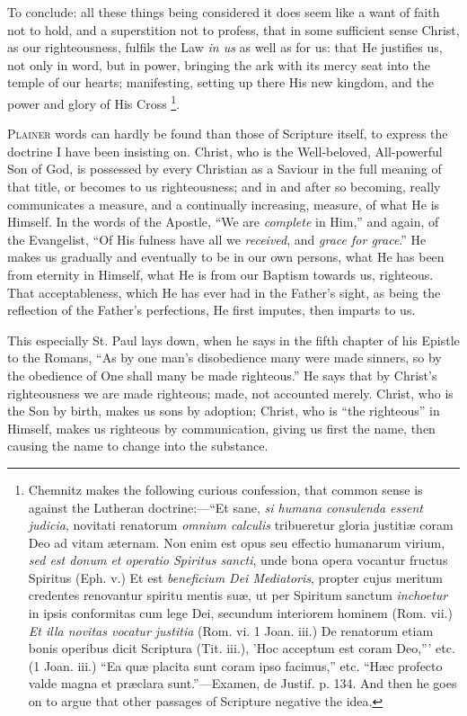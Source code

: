 To conclude: all these things being considered it does seem like a
want of faith not to hold, and a superstition not to profess, that in
some sufficient sense Christ, as our righteousness, fulfils the Law \emph{in
us} as well as for us: that He justifies us, not only in word, but
in power, bringing the ark with its mercy seat into the temple
of our hearts; manifesting, setting up there His new kingdom, and the
power and glory of His Cross \footnote{Chemnitz makes
the following curious confession, that common sense is against the
Lutheran doctrine:—``Et sane, \emph{si humana consulenda essent
judicia}, novitati renatorum \emph{omnium calculis} tribueretur
gloria justitiæ coram Deo ad vitam æternam. Non enim est opus seu
effectio humanarum virium, \emph{sed est donum et operatio Spiritus
sancti}, unde bona opera vocantur fructus Spiritus (Eph. v.) Et est
\emph{beneficium Dei Mediatoris}, propter cujus meritum credentes
renovantur spiritu mentis suæ, ut per Spiritum sanctum \emph{inchoetur}
in ipsis conformitas cum lege Dei, secundum interiorem hominem (Rom.
vii.) \emph{Et illa novitas vocatur justitia} (Rom. vi. 1 Joan. iii.)
De renatorum etiam bonis operibus dicit Scriptura (Tit. iii.), 'Hoc
acceptum est coram Deo,''' etc. (1 Joan. iii.) ``Ea quæ
placita sunt coram ipso facimus,'' etc. ``Hæc profecto valde
magna et præclara sunt.''—Examen, de Justif. p. 134. And then
he goes on to argue that other passages of Scripture negative the
idea.}.


P\textsc{lainer} words can hardly be found than those of Scripture
itself, to express the doctrine I have been insisting on. Christ, who
is the Well-beloved, All-powerful Son of God, is possessed by every
Christian as a Saviour in the full meaning of that title, or becomes
to us righteousness; and in and after so becoming, really communicates
a measure, and a continually increasing, measure, of what He is
Himself. In the words of the Apostle, ``We are \emph{complete} in
Him,'' and again, of the Evangelist, ``Of His fulness have all
we \emph{received}, and \emph{grace for grace}.'' He makes us
gradually and eventually to be in our own persons, what He has been
from eternity in Himself, what He is from our Baptism towards us,
righteous. That acceptableness, which He has ever had in the Father's
sight, as being the reflection of the Father's perfections, He first
imputes, then imparts to us.

This especially St. Paul lays down, when he says in the fifth
chapter of his Epistle to the Romans, ``As by one man's
disobedience many were made sinners, so by the obedience of One shall
many be made righteous.'' He says that by Christ's righteousness
we are made righteous; made, not accounted merely. Christ, who is the
Son by birth, makes us sons by adoption; Christ, who is
``the righteous'' in Himself, makes us righteous by
communication, giving us first the name, then causing the name to
change into the substance.

